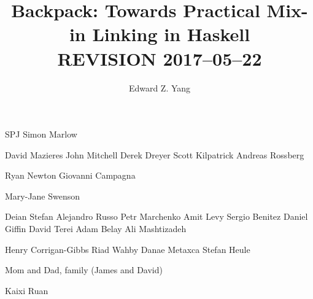 \documentclass{report}
\begin{document}
\title{Backpack: Towards Practical Mix-in Linking in Haskell \\ REVISION 2017--05--22}
\author{Edward Z. Yang}

\beforepreface%
    SPJ
    Simon Marlow

    David Mazieres
    John Mitchell
    Derek Dreyer
    Scott Kilpatrick
    Andreas Rossberg

    Ryan Newton
    Giovanni Campagna

    Mary-Jane Swenson

    Deian Stefan
    Alejandro Russo
    Petr Marchenko
    Amit Levy
    Sergio Benitez
    Daniel Giffin
    David Terei
    Adam Belay
    Ali Mashtizadeh

    Henry Corrigan-Gibbs
    Riad Wahby
    Danae Metaxca
    Stefan Heule

    Mom and Dad, family (James and David)

    Kaixi Ruan
\afterpreface%
















\end{document}
